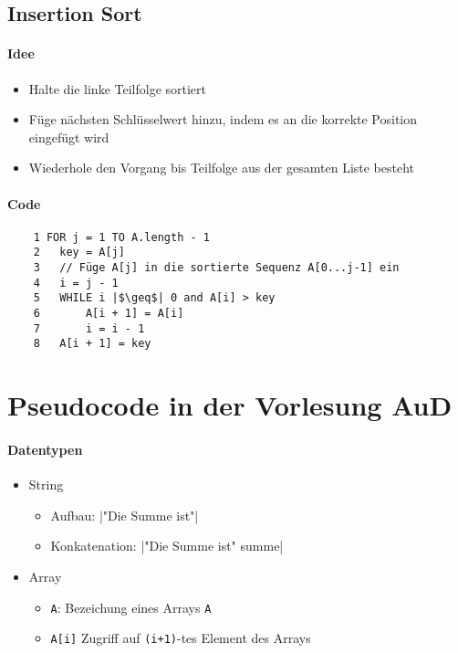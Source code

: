 \subsection{Insertion Sort}

\paragraph{Idee}

    \begin{itemize}
        \item Halte die linke Teilfolge sortiert
        \item Füge nächsten Schlüsselwert hinzu, indem es an die korrekte Position eingefügt wird
        \item Wiederhole den Vorgang bis Teilfolge aus der gesamten Liste besteht
    \end{itemize}

\paragraph{Code}
    \begin{verbatim}  
    1 FOR j = 1 TO A.length - 1
    2   key = A[j]
    3   // Füge A[j] in die sortierte Sequenz A[0...j-1] ein
    4   i = j - 1
    5   WHILE i |$\geq$| 0 and A[i] > key
    6       A[i + 1] = A[i]
    7       i = i - 1
    8   A[i + 1] = key
    \end{verbatim}



\section{Pseudocode in der Vorlesung AuD}

\paragraph{Datentypen}
	\begin{itemize}
		\item String
			\begin{itemize}
				\item Aufbau: |"Die Summe ist"|
				\item Konkatenation: |"Die Summe ist" summe|  
            \end{itemize}
        \item Array
            \begin{itemize}
                \item \texttt{A}: Bezeichung eines Arrays \texttt{A}
                \item \texttt{A[i]} Zugriff auf \texttt{(i+1)}-tes Element des Arrays
            \end{itemize}
	\end{itemize}



